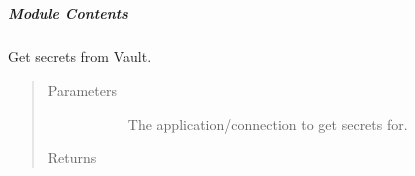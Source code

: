 \documentclass[letterpaper,10pt,english]{sphinxmanual}
\begin{document}

\begin{fulllineitems}
\label{\detokenize{autoapi/src/utils/snowflake/index:src.utils.snowflake.read_forecasts}}
\end{fulllineitems}



\subparagraph{}
\label{\detokenize{autoapi/src/utils/vault/index:module-src.utils.vault}}\label{\detokenize{autoapi/src/utils/vault/index:src-utils-vault}}\label{\detokenize{autoapi/src/utils/vault/index::doc}}

\subparagraph{Module Contents}
\label{\detokenize{autoapi/src/utils/vault/index:module-contents}}

\begin{fulllineitems}
\label{\detokenize{autoapi/src/utils/vault/index:src.utils.vault.get_secrets}}
Get secrets from Vault.
\begin{quote}\begin{description}
\item[{Parameters}] \leavevmode\begin{description}
\item[{}] \leavevmode
The application/connection to get secrets for.

\end{description}

\item[{Returns}] \leavevmode\begin{description}
\item[{ }] \leavevmode
\end{description}

\end{description}\end{quote}

\end{fulllineitems}
\end{document}
